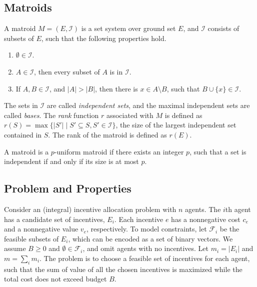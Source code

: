 \documentclass{article}
\newcommand{\N}{\mathbb{N}}
\begin{document}
\subsection{Matroids}

A matroid $M=(E,\mathcal{I})$ is a set system over ground set $E$, and $\mathcal{I}$ consists of subsets of $E$, such that the following properties hold. 

\begin{enumerate}
\item $\emptyset\in \mathcal{I}$.
\item $A\in \mathcal{I}$, then every subset of $A$ is in $\mathcal{I}$.
\item If $A,B\in \mathcal{I}$, and $|A|>|B|$, then there is $x\in A\setminus B$, such that $B\cup \{x\}\in \mathcal{I}$. 
\end{enumerate}

The sets in $\mathcal{I}$ are called \emph{independent sets}, and the maximal independent sets are called \emph{bases}. The \emph{rank} function $r$ associated with $M$ is defined as $r(S) =\max\{ |S'|  \mid S'\subseteq S ,S' \in \mathcal{I}\}$, the size of the largest independent set contained in $S$. The rank of the matroid is defined as $r(E)$. 

A matroid is a $p$-uniform matroid if there exists an integer $p$, such that a set is independent if and only if its size is at most $p$. %

\subsection{Problem and Properties}
Consider an (integral) incentive allocation problem with $n$ agents. The $i$th agent has a candidate set of incentives, $E_i$. Each incentive $e$ has a nonnegative cost $c_e$ and a nonnegative value $v_e$, respectively. To model constraints, let $\mathcal{F}_i$ be the feasible subsets of $E_i$, which can be encoded as a set of binary vectors. We assume $B\geq 0$ and $\emptyset\in\mathcal{F}_i$, and omit agents with no incentives. Let $m_i = |E_i|$ and $m=\sum_{i} m_i$. The problem is to choose a feasible set of incentives for each agent, such that the sum of value of all the chosen incentives is maximized while the total cost does not exceed budget $B$.
\end{document}
